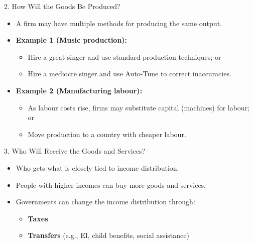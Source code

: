 \documentclass[aspectratio=169]{beamer}
\begin{document}
\begin{frame}{2. How Will the Goods Be Produced?}
\transfade
\begin{itemize}[<+->]
  \item A firm may have multiple methods for producing the same output.
  \item \textbf{Example 1 (Music production):}
  \begin{itemize}[<+->]
    \item Hire a great singer and use standard production techniques; or
    \item Hire a mediocre singer and use Auto-Tune to correct inaccuracies.
  \end{itemize}
  \item \textbf{Example 2 (Manufacturing labour):}
  \begin{itemize}[<+->]
    \item As labour costs rise, firms may substitute capital (machines) for labour; or
    \item Move production to a country with cheaper labour.
  \end{itemize}
\end{itemize}
\end{frame}

\begin{frame}{3. Who Will Receive the Goods and Services?}
\transfade
\begin{itemize}[<+->]
  \item Who gets what is closely tied to \alert{income distribution}.
  \item People with higher incomes can buy more goods and services.
  \item Governments can change the income distribution through:
  \begin{itemize}[<+->]
    \item \textbf{Taxes}
    \item \textbf{Transfers} (e.g., EI, child benefits, social assistance)
  \end{itemize}
\end{itemize}
\end{frame}
\end{document}
